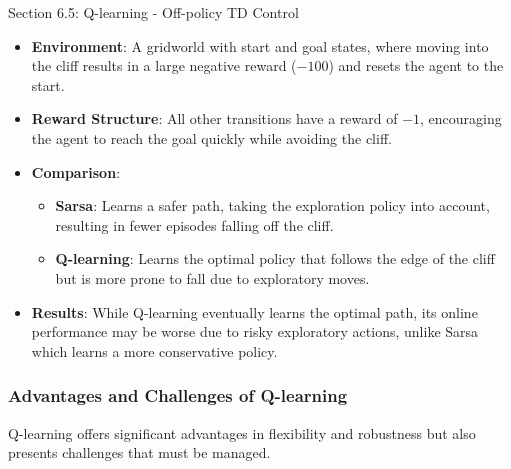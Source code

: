 \begin{notes}{Section 6.5: Q-learning - Off-policy TD Control}
\begin{highlight}
        \begin{itemize}
            \item \textbf{Environment}: A gridworld with start and goal states, where moving into the cliff results in a large negative reward ($-100$) and resets the agent to the start.
            \item \textbf{Reward Structure}: All other transitions have a reward of $-1$, encouraging the agent to reach the goal quickly while avoiding the cliff.
            \item \textbf{Comparison}:
                \begin{itemize}
                    \item \textbf{Sarsa}: Learns a safer path, taking the exploration policy into account, resulting in fewer episodes falling off the cliff.
                    \item \textbf{Q-learning}: Learns the optimal policy that follows the edge of the cliff but is more prone to fall due to exploratory moves.
                \end{itemize}
            \item \textbf{Results}: While Q-learning eventually learns the optimal path, its online performance may be worse due to risky exploratory actions, unlike Sarsa which learns a more conservative policy.
        \end{itemize}
    
    \end{highlight}
    
    \subsubsection*{Advantages and Challenges of Q-learning}
    
    Q-learning offers significant advantages in flexibility and robustness but also presents challenges that must be managed.
    
    \begin{highlight}
    

\end{highlight}
\end{notes}
